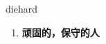 
\begin{frame}
{\huge diehard}
\begin{center}
\begin{enumerate}\Large
  \item \textbf{顽固的，保守的人}
\end{enumerate}
\end{center}
\end{frame}
